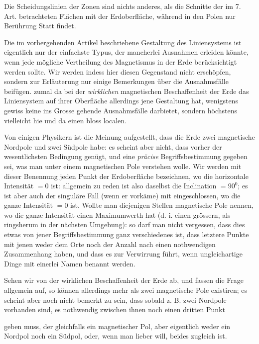 Die Scheidungslinien der Zonen sind nichts anderes, als die Schnitte der im 7. Art. betrachteten Flächen mit der Erdoberfläche, während in den Polen nur Berührung Statt findet.

Die im vorhergehenden Artikel beschriebene Gestaltung des Liniensystems ist eigentlich nur der einfachste Typus, der mancherlei Ausnahmen erleiden könnte, wenn jede mögliche Vertheilung des Magnetismus in der Erde berücksichtigt werden sollte. Wir werden indess hier diesen Gegenstand nicht erschöpfen, sondern zur Erläuterung nur einige Bemerkungen über die Ausnahmsfälle beifügen. zumal da bei der \textit{wirklichen} magnetischen Beschaffenheit der Erde das Liniensystem auf ihrer Oberfläche allerdings jene Gestaltung hat, wenigstens gewiss keine ins Grosse gehende Ausnahmsfälle darbietet, sondern höchstens vielleicht hie und da einen bloss localen.

Von einigen Physikern ist die Meinung aufgestellt, dass die Erde zwei magnetische Nordpole und zwei Südpole habe: es scheint aber nicht, dass vorher der wesentlichsten Bedingung genügt, und eine \textit{präcise} Begriffsbestimmung gegeben sei, was man unter einem magnetischen Pole verstehen wolle. Wir werden mit dieser Benennung jeden Punkt der Erdoberfläche bezeichnen, wo die horizontale Intensität $=0$ ist: allgemein zu reden ist also daselbst die Inclination $=90^0$; es ist aber auch der singuläre Fall (wenn er vorkäme) mit eingeschlossen, wo die ganze Intensität $=0$ ist. Wollte man diejenigen Stellen magnetische Pole nennen, wo die ganze Intensität einen Maximumwerth hat (d. i. einen grössern, als ringsherum in der nächsten Umgebung): so darf man nicht vergessen, dass dies etwas von jener Begriffsbestimmung ganz verschiedenes ist, dass letztere Punkte mit jenen weder dem Orte noch der Anzahl nach einen nothwendigen Zusammenhang haben, und dass es zur Verwirrung führt, wenn ungleichartige Dinge mit einerlei Namen benannt werden.

Sehen wir von der wirklichen Beschaffenheit der Erde ab, und fassen die Frage allgemein auf, so können allerdings mehr als zwei magnetische Pole existiren; es scheint aber noch nicht bemerkt zu sein, dass sobald z. B. zwei Nordpole vorhanden sind, es nothwendig zwischen ihnen noch einen dritten Punkt
\par\clearpage
{}
\noindent geben muss, der gleichfalls ein magnetischer Pol, aber eigentlich weder ein Nordpol noch ein Südpol, oder, wenn man lieber will, beides zugleich ist.

